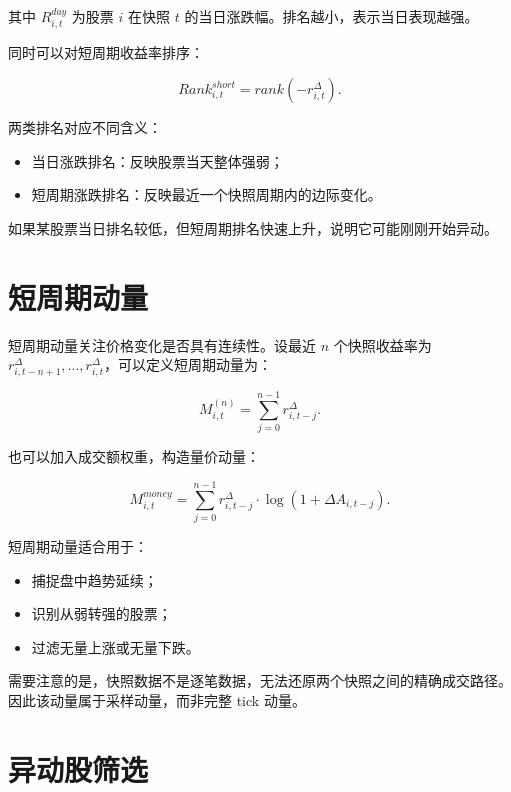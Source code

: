 \documentclass[UTF8,a4paper,12pt]{ctexart}
\begin{document}
其中 $R_{i,t}^{day}$ 为股票 $i$ 在快照 $t$ 的当日涨跌幅。排名越小，表示当日表现越强。

同时可以对短周期收益率排序：

\begin{equation}
Rank_{i,t}^{short} = rank(-r_{i,t}^{\Delta}).
\end{equation}

两类排名对应不同含义：

\begin{itemize}
  \item 当日涨跌排名：反映股票当天整体强弱；
  \item 短周期涨跌排名：反映最近一个快照周期内的边际变化。
\end{itemize}

如果某股票当日排名较低，但短周期排名快速上升，说明它可能刚刚开始异动。

\section{短周期动量}

短周期动量关注价格变化是否具有连续性。设最近 $n$ 个快照收益率为 $r_{i,t-n+1}^{\Delta}, \ldots, r_{i,t}^{\Delta}$，可以定义短周期动量为：

\begin{equation}
M_{i,t}^{(n)} = \sum_{j=0}^{n-1} r_{i,t-j}^{\Delta}.
\end{equation}

也可以加入成交额权重，构造量价动量：

\begin{equation}
M_{i,t}^{money} = \sum_{j=0}^{n-1} r_{i,t-j}^{\Delta} \cdot \log(1 + \Delta A_{i,t-j}).
\end{equation}

短周期动量适合用于：

\begin{itemize}
  \item 捕捉盘中趋势延续；
  \item 识别从弱转强的股票；
  \item 过滤无量上涨或无量下跌。
\end{itemize}

需要注意的是，快照数据不是逐笔数据，无法还原两个快照之间的精确成交路径。因此该动量属于采样动量，而非完整 tick 动量。

\section{异动股筛选}
\end{document}
